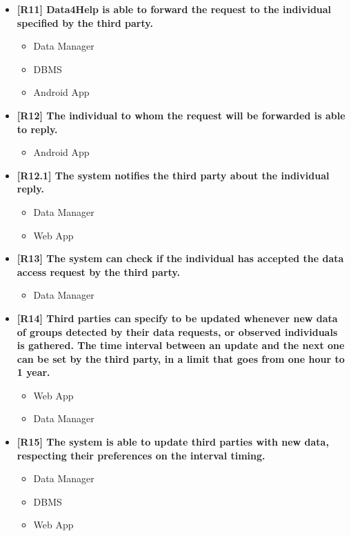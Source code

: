 \begin{itemize}
\item \textbf{[R11] Data4Help is able to forward the request to the individual specified by the third party.}
\begin{itemize}
\item Data Manager
\item DBMS
\item Android App
\end{itemize}

\item \textbf{[R12] The individual to whom the request will be forwarded is able to reply.}
\begin{itemize}
\item Android App
\end{itemize}


\item \textbf{[R12.1] The system notifies the third party about the individual reply.}
\begin{itemize}
\item Data Manager
\item Web App
\end{itemize}


\item \textbf{[R13] The system can check if the individual has accepted the data access request by the third party.}
\begin{itemize}
\item Data Manager
\end{itemize}

\item \textbf{[R14] Third parties can specify to be updated whenever new data of groups detected by their data requests, or observed individuals is gathered. The time interval between an update and the next one can be set by the third party, in a limit that goes from one hour to 1 year.}
\begin{itemize}
\item Web App
\item Data Manager
\end{itemize}


\item \textbf{[R15] The system is able to update third parties with new data, respecting their preferences on the interval timing.}
\begin{itemize}
\item Data Manager
\item DBMS
\item Web App
\end{itemize}


\end{itemize}
